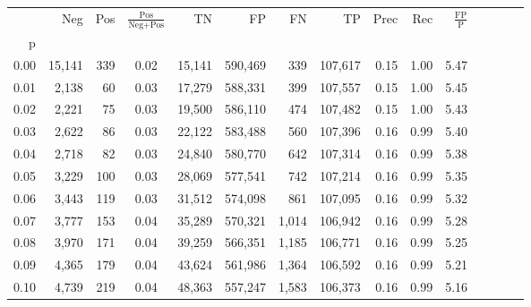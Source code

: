 \begin{tabular}{rrrcrrrrrrrrrrr}
\toprule
{} &     Neg &    Pos & $\frac{\text{Pos}}{\text{Neg}+\text{Pos}}$ &       TN &       FP &       FN &       TP &  Prec &   Rec & $\frac{\text{FP}}{\text{P}}$ \\
p    &         &        &                                            &          &          &          &          &       &       &                              \\
\midrule
0.00 &  15,141 &    339 &                                       0.02 &   15,141 &  590,469 &      339 &  107,617 &  0.15 &  1.00 &                         5.47 \\
0.01 &   2,138 &     60 &                                       0.03 &   17,279 &  588,331 &      399 &  107,557 &  0.15 &  1.00 &                         5.45 \\
0.02 &   2,221 &     75 &                                       0.03 &   19,500 &  586,110 &      474 &  107,482 &  0.15 &  1.00 &                         5.43 \\
0.03 &   2,622 &     86 &                                       0.03 &   22,122 &  583,488 &      560 &  107,396 &  0.16 &  0.99 &                         5.40 \\
0.04 &   2,718 &     82 &                                       0.03 &   24,840 &  580,770 &      642 &  107,314 &  0.16 &  0.99 &                         5.38 \\
0.05 &   3,229 &    100 &                                       0.03 &   28,069 &  577,541 &      742 &  107,214 &  0.16 &  0.99 &                         5.35 \\
0.06 &   3,443 &    119 &                                       0.03 &   31,512 &  574,098 &      861 &  107,095 &  0.16 &  0.99 &                         5.32 \\
0.07 &   3,777 &    153 &                                       0.04 &   35,289 &  570,321 &    1,014 &  106,942 &  0.16 &  0.99 &                         5.28 \\
0.08 &   3,970 &    171 &                                       0.04 &   39,259 &  566,351 &    1,185 &  106,771 &  0.16 &  0.99 &                         5.25 \\
0.09 &   4,365 &    179 &                                       0.04 &   43,624 &  561,986 &    1,364 &  106,592 &  0.16 &  0.99 &                         5.21 \\
0.10 &   4,739 &    219 &                                       0.04 &   48,363 &  557,247 &    1,583 &  106,373 &  0.16 &  0.99 &                         5.16 \\

\end{tabular}
